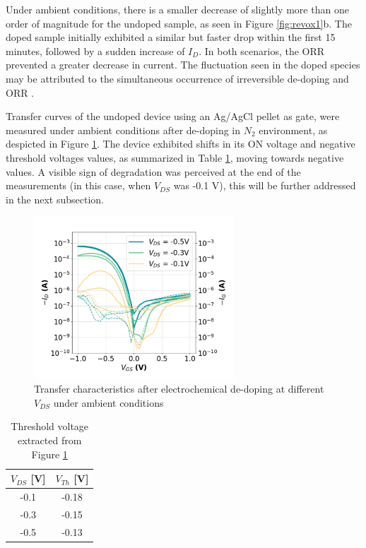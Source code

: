 Under ambient conditions, there is a smaller decrease of slightly more than one order of magnitude for the undoped sample, as seen in Figure \ref{fig:revox1}b. The doped sample initially exhibited a similar but faster drop within the first 15 minutes, followed by a sudden increase of $I_{D}$. In both scenarios, the ORR prevented a greater decrease in current. The fluctuation seen in the doped species may be attributed to the simultaneous occurrence of irreversible de-doping %
and ORR . %

Transfer curves of the undoped device using an Ag/AgCl pellet as gate, were measured under ambient conditions after de-doping in $N_{2}$ environment, as despicted in Figure \ref{fig:transrevox1}. The device exhibited shifts in its ON voltage and negative threshold voltages values, as summarized in Table \ref{tab:vth_air}, moving towards negative values. A visible sign of degradation was perceived at the end of the measurements (in this case, when $V_{DS}$ was -0.1 V), this will be further addressed in the next subsection.

\begin{figure}[ht]
    \centering
    \includegraphics[width=7.5cm]{Images/pdf/revox_transfer_loop2.pdf}%
    \caption[Transfer characteristics after electrochemical de-doping]{Transfer characteristics after electrochemical de-doping at different $V_{DS}$ under ambient conditions}
    \label{fig:transrevox1}
\end{figure}

\begin{table}[ht]
\centering
\caption{Threshold voltage extracted from Figure \ref{fig:transrevox1}}
\begin{tabular}{c|c}
 $V_{DS}$ [V] & $V_{Th}$ [V] \\\hline
-0.1 & -0.18 \\
-0.3 & -0.15 \\
-0.5 & -0.13 \\ \hline
\end{tabular}
\label{tab:vth_air}
\end{table}

